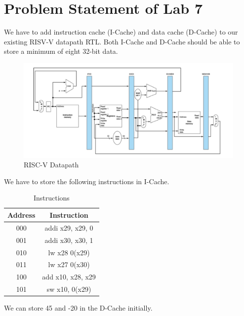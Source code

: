 \section{Problem Statement of Lab 7}


We have to add instruction cache (I-Cache) and data cache (D-Cache) to our existing RISV-V datapath RTL. Both I-Cache and D-Cache should be able to store a minimum of eight 32-bit data.
\begin{figure}[h]
    \centering
    \includegraphics[width=\linewidth]{images/datapath_lab_7.jpeg}
    \caption{RISC-V Datapath}
    \label{fig1:lab_datapath}
\end{figure}

We have to store the following instructions in I-Cache.
\begin{table}[h]
\centering
\begin{tabular}{|c|c|}
\hline
\textbf{Address} & \textbf{Instruction} \\ \hline
000              & addi x29, x29, 0     \\ \hline
001              & addi x30, x30, 1     \\ \hline
010              & lw x28 0(x29)        \\ \hline
011              & lw x27 0(x30)        \\ \hline
100              & add x10, x28, x29    \\ \hline
101              & sw x10, 0(x29)       \\ \hline
\end{tabular}
\caption{Instructions}
\label{given_instructions}
\end{table}
We can store 45 and -20 in the D-Cache initially.
